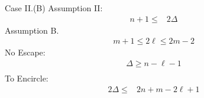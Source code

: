 \documentclass[letterpaper, 10pt]{article}
\begin{document}
{ \color{red} Case II.(B)
 Assumption II:
 \begin{align*}
  n+1 \leq & 2 \Delta
 \end{align*}
 Assumption B.
 \begin{align*}
  m + 1 \leq 2 \ell \leq 2m - 2
 \end{align*} }
{ \color{blue}
 No Escape:
 \begin{align*}
  \Delta \geq n - \ell -1 \\
 \end{align*}
 To Encircle:
 \begin{align*}
  2 \Delta \leq & 2n + m - 2\ell + 1
 \end{align*} }
\end{document}
